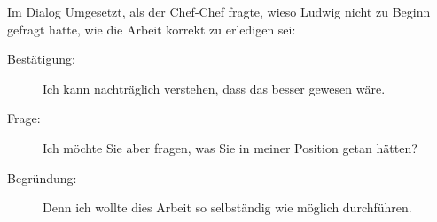 Im Dialog Umgesetzt, als der Chef-Chef fragte, wieso Ludwig nicht zu
Beginn gefragt hatte, wie die Arbeit korrekt zu erledigen sei:
\begin{description}
  \item[Bestätigung:] Ich kann nachträglich verstehen, dass das besser
    gewesen wäre.
  \item[Frage:] Ich möchte Sie aber fragen, was Sie in meiner Position
    getan hätten?
  \item[Begründung:] Denn ich wollte dies Arbeit so selbständig wie
    möglich durchführen.
\end{description}




